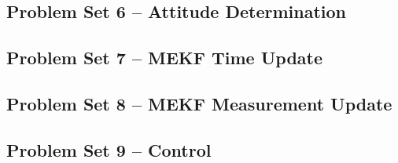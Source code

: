 \newpage
\subsection{Problem Set 6 – Attitude Determination}






\newpage
\subsection{Problem Set 7 – MEKF Time Update}


\newpage
\subsection{Problem Set 8 – MEKF Measurement Update}




\newpage
\subsection{Problem Set 9 – Control}
